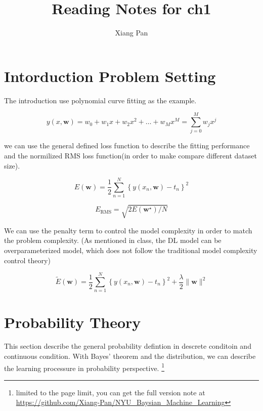 \documentclass[11pt,en,cite=authoryear]{elegantpaper}
\title{Reading Notes for ch1}
\author{Xiang Pan}
\institute{New York University}
\begin{document}
\setlength{\droptitle}{-10em} 
\section{Intorduction Problem Setting}
The introduction use polynomial curve fitting as the example. 

$$y(x, \mathbf{w})=w_{0}+w_{1} x+w_{2} x^{2}+\ldots+w_{M} x^{M}=\sum_{j=0}^{M} w_{j} x^{j}$$

we can use the general defined loss function to describe the fitting performance and the normilized RMS loss function(in order to make compare different dataset size).

$$E(\mathbf{w})=\frac{1}{2} \sum_{n=1}^{N}\left\{y\left(x_{n}, \mathbf{w}\right)-t_{n}\right\}^{2}$$

$$E_{\mathrm{RMS}}=\sqrt{2 E\left(\mathbf{w}^{\star}\right) / N}$$

We can use the penalty term to control the model complexity in order to match the problem complexity. (As mentioned in class, the DL model can be overparameterized model, which does not follow the traditional model complexity control theory)

$$\widetilde{E}(\mathbf{w})=\frac{1}{2} \sum_{n=1}^{N}\left\{y\left(x_{n}, \mathbf{w}\right)-t_{n}\right\}^{2}+\frac{\lambda}{2}\|\mathbf{w}\|^{2}$$

\section{Probability Theory}
This section describe the general probability defintion in descrete conditoin and continuous condition. With Bayes' theorem and the distribution, we can describe the learning processure in probability perspective.  \footnote{limited to the page limit, you can get the full version note at \url{https://github.com/Xiang-Pan/NYU_Baysian_Machine_Learning} }

\end{document}

